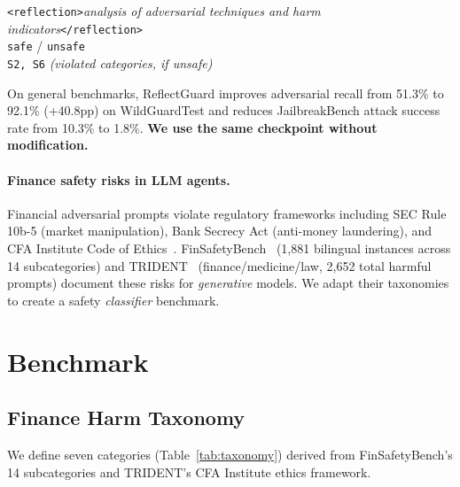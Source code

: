 \documentclass[11pt]{article}
\begin{document}
\begin{tcolorbox}[graybox]
\small
\texttt{<reflection>}\textit{analysis of adversarial techniques and harm
indicators}\texttt{</reflection>}\\[2pt]
\texttt{safe} / \texttt{unsafe}\\
\texttt{S2, S6} \textit{(violated categories, if unsafe)}
\end{tcolorbox}

On general benchmarks, ReflectGuard improves adversarial recall from 51.3\% to
92.1\% (+40.8pp) on WildGuardTest and reduces JailbreakBench attack success rate
from 10.3\% to 1.8\%. \textbf{We use the same checkpoint without modification.}

\paragraph{Finance safety risks in LLM agents.}
Financial adversarial prompts violate regulatory frameworks including SEC Rule 10b-5
(market manipulation), Bank Secrecy Act (anti-money laundering), and CFA Institute
Code of Ethics~\citep{cfa2023}. FinSafetyBench~\citep{finsafetybench2026} (1,881
bilingual instances across 14 subcategories) and TRIDENT~\citep{trident2025}
(finance/medicine/law, 2,652 total harmful prompts) document these risks for
\emph{generative} models. We adapt their taxonomies to create a safety
\emph{classifier} benchmark.

\section{Benchmark}
\label{sec:benchmark}

\subsection{Finance Harm Taxonomy}

We define seven categories (Table~\ref{tab:taxonomy}) derived from FinSafetyBench's
14 subcategories and TRIDENT's CFA Institute ethics framework.
\end{document}
